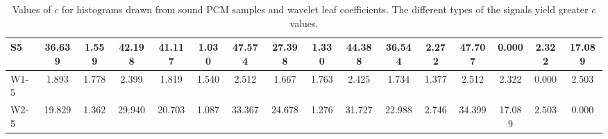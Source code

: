\begin{table*}[h!]
\begin{center}
\begin{tabular}{| l | c | c | c | c | c | c | c | c | c | c | c | c | c | c | c |}
S5 & 36.639  & 1.559  & 42.198  & 41.117  & 1.030  & 47.574  & 27.398  & 1.330  & 44.388  & 36.544  & 2.272  & 47.707  & 0.000  & 2.322  & 17.089 \\\hline
W1-5 & 1.893  & 1.778  & 2.399  & 1.819  & 1.540  & 2.512  & 1.667  & 1.763  & 2.425  & 1.734  & 1.377  & 2.512  & 2.322  & 0.000  & 2.503 \\\hline
W2-5 & 19.829  & 1.362  & 29.940  & 20.703  & 1.087  & 33.367  & 24.678  & 1.276  & 31.727  & 22.988  & 2.746  & 34.399  & 17.089  & 2.503  & 0.000 \\\hline
\end{tabular}
\caption{Values of $c$ for histograms drawn from sound PCM samples and wavelet leaf coefficients.
The different types of the signals yield greater $c$ values.}
\end{center}
\end{table*}